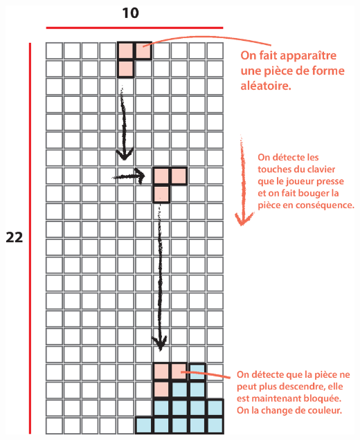 \documentclass[a4paper]{article}
\begin{document}
\begin{center}
    \includegraphics[scale=0.5]{img/game-explanation.eps} 
\end{center}

%
\end{document}
